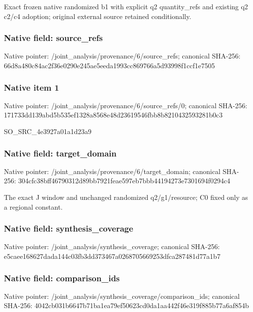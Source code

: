 \documentclass[10pt,a4paper]{article}
\begin{document}
\begingroup\raggedright\sloppy Exact frozen native randomized b1 with explicit q2 quantity\_\allowbreak{}refs and existing q2 c2/\allowbreak{}c4 adoption;\allowbreak{} original external source retained conditionally.\par\endgroup

\subsubsection{Native field: source\_\allowbreak{}refs}
Native pointer: /joint\_\allowbreak{}analysis/provenance/6/source\_\allowbreak{}refs; canonical SHA-256: 66d8a480c84ac2f36e0290e245ae5eeda1993cc869766a5d93998f1ccf1e7505

\subsubsection{Native item 1}
Native pointer: /joint\_\allowbreak{}analysis/provenance/6/source\_\allowbreak{}refs/0; canonical SHA-256: 171733dd139abd5b535ef1328a8568e48d23619546fbb8b8210432593281b0c3

\begingroup\raggedright\sloppy SO\_\allowbreak{}SRC\_\allowbreak{}4e3927a01a1d23a9\par\endgroup

\subsubsection{Native field: target\_\allowbreak{}domain}
Native pointer: /joint\_\allowbreak{}analysis/provenance/6/target\_\allowbreak{}domain; canonical SHA-256: 304cfc38bff46790312d89bb7921feae597eb7bbb44194273e7301694f0294c4

\begingroup\raggedright\sloppy The exact J window and unchanged randomized q2/\allowbreak{}g1/\allowbreak{}resource;\allowbreak{} C0 fixed only as a regional constant.\par\endgroup

\subsubsection{Native field: synthesis\_\allowbreak{}coverage}
Native pointer: /joint\_\allowbreak{}analysis/synthesis\_\allowbreak{}coverage; canonical SHA-256: e5caee168627dada144c03fb3dd373467a0268705669253dfca287481d77a1b7

\subsubsection{Native field: comparison\_\allowbreak{}ids}
Native pointer: /joint\_\allowbreak{}analysis/synthesis\_\allowbreak{}coverage/comparison\_\allowbreak{}ids; canonical SHA-256: 4042cb031b6647b71ba1ea79ef50623cd0da1aa442f46e319f885b77a6af854b
\end{document}
